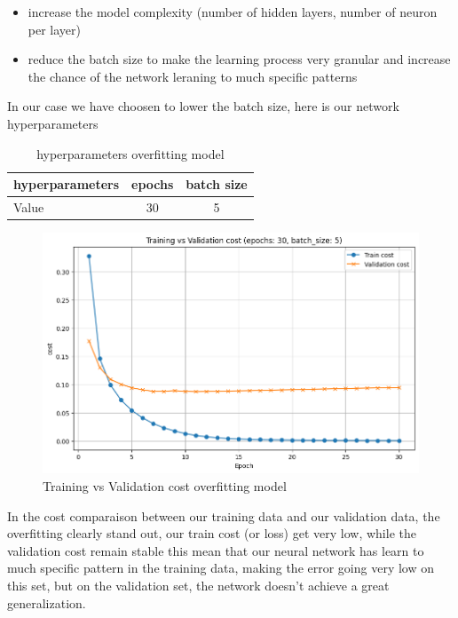 \documentclass[a4paper, twocolumn, twoside]{article}
\begin{document}
	\begin{itemize}
		\item increase the model complexity (number of hidden layers, number of neuron per layer)
		\item reduce the batch size to make the learning process very granular 
			and increase the chance of the network leraning to much specific patterns
	\end{itemize}

	In our case we have choosen to lower the batch size, here is our network hyperparameters

	\begin{table}[H]
	\centering
	\begin{tabular}{|l|c|c|}
	\hline
	hyperparameters & epochs & batch size  \\
	\hline
	Value & 30 & 5   \\
	\hline
	\end{tabular}
	\caption{hyperparameters overfitting model}
	\end{table}

	\begin{figure}[H]
		\begin{center}
			\includegraphics[width=\columnwidth]{images/cost_overfit.png}
		\end{center}
		\caption{Training vs Validation cost overfitting model}\label{fig:cost_overfit}
	\end{figure}

	In the cost comparaison between our training data and our validation data, the overfitting
	clearly stand out, our train cost (or loss) get very low, while the validation cost remain stable
	this mean that our neural network has learn to much specific pattern in the training data,
	making the error going very low on this set, but on the validation set, the network
	doesn't achieve a great generalization.
\end{document}
